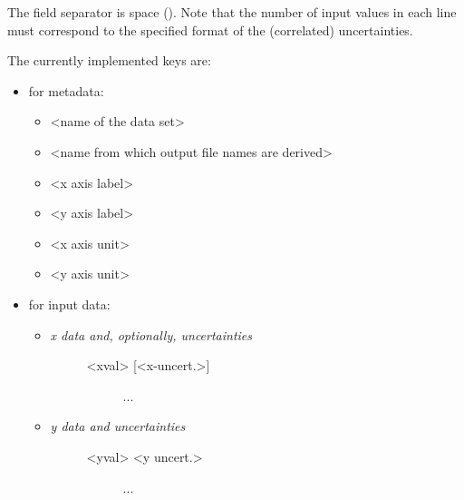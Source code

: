 \documentclass[a4paper,10pt,english]{sphinxmanual}
\begin{document}
\begin{fulllineitems}
The field separator is space (). Note that the number of input
values in each line must correspond to the specified format of the
(correlated) uncertainties.

The currently implemented keys are:
\begin{itemize}
\item {} 
for metadata:
\begin{itemize}
\item {} 
     \textless{}name of the data set\textgreater{}

\item {} 
  \textless{}name from which output file names are derived\textgreater{}

\item {} 
    \textless{}x axis label\textgreater{}

\item {} 
    \textless{}y axis label\textgreater{}

\item {} 
      \textless{}x axis unit\textgreater{}

\item {} 
      \textless{}y axis unit\textgreater{}

\end{itemize}

\item {} 
for input data:
\begin{itemize}
\item {} \begin{description}
\item[{     \emph{x data and, optionally, uncertainties}}] \leavevmode\begin{description}
\item[{\textless{}xval\textgreater{}  {[}\textless{}x-uncert.\textgreater{}{]}}] \leavevmode
...

\end{description}

\end{description}

\item {} \begin{description}
\item[{     \emph{y data and uncertainties}}] \leavevmode\begin{description}
\item[{\textless{}yval\textgreater{}  \textless{}y uncert.\textgreater{}}] \leavevmode
...


\end{description}
\end{description}
\end{itemize}
\end{itemize}
\end{fulllineitems}
\end{document}
